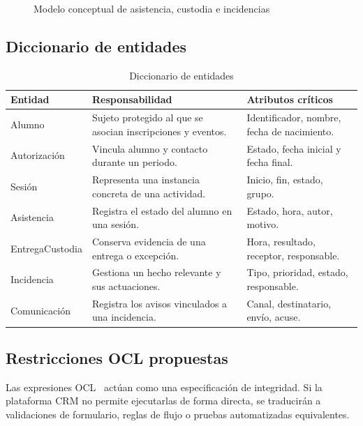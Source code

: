 \begin{figure}[htbp]
\centering
{}
\caption{Modelo conceptual de asistencia, custodia e incidencias}\label{fig:4}
\end{figure}

\subsection{Diccionario de entidades}\label{sec:4-2-1}

\begin{table}[H]
\centering\small
\begin{tabularx}{\textwidth}{>{\hsize=0.673\hsize\raggedright\arraybackslash}X>{\hsize=1.294\hsize\raggedright\arraybackslash}X>{\hsize=1.033\hsize\raggedright\arraybackslash}X}
\toprule
\rowcolor{cabeceratabla} \textbf{Entidad} & \textbf{Responsabilidad} & \textbf{Atributos críticos} \\
\midrule
Alumno & Sujeto protegido al que se asocian inscripciones y eventos. & Identificador, nombre, fecha de nacimiento. \\
Autorización & Vincula alumno y contacto durante un periodo. & Estado, fecha inicial y fecha final. \\
Sesión & Representa una instancia concreta de una actividad. & Inicio, fin, estado, grupo. \\
Asistencia & Registra el estado del alumno en una sesión. & Estado, hora, autor, motivo. \\
EntregaCustodia & Conserva evidencia de una entrega o excepción. & Hora, resultado, receptor, responsable. \\
Incidencia & Gestiona un hecho relevante y sus actuaciones. & Tipo, prioridad, estado, responsable. \\
Comunicación & Registra los avisos vinculados a una incidencia. & Canal, destinatario, envío, acuse. \\
\bottomrule
\end{tabularx}
\caption{Diccionario de entidades}\label{tab:32}
\end{table}

\subsection{Restricciones OCL propuestas}\label{sec:4-2-2}

Las expresiones OCL~\cite{ref34} actúan como una especificación de integridad. Si la plataforma CRM no permite ejecutarlas de forma directa, se traducirán a validaciones de formulario, reglas de flujo o pruebas automatizadas equivalentes.

